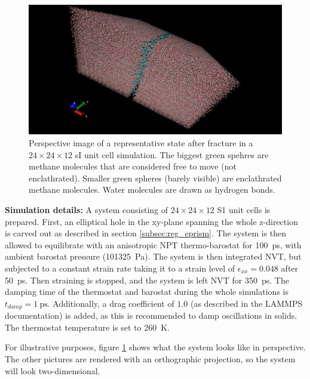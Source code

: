 \begin{figure}
\includegraphics[width=\textwidth]{../pictures/system_1048.pdf}
\caption{Perspective image of a representative state after fracture in a $24\times 24 \times 12$ sI unit cell simulation. The biggest green spehres are methane molecules that are considered free to move (not enclathrated). Smaller green spheres (barely visible) are enclathrated methane molecules. Water molecules are drawn as hydrogen bonds.}
\label{fig:system_1048}
\end{figure}

\begin{framed} 
\textbf{Simulation details:} A system consisting of $24 \times 24\times 12$ S1 unit cells is prepared. First, an elliptical hole in the xy-plane spanning the whole z-direction is carved out as described in section \ref{subsec:reg_eprism}. The system is then allowed to equilibrate with an anisotropic NPT thermo-barostat for \SI{100}{\pico\second}, with ambient barostat pressure (\SI{101325}{\pascal}). The system is then integrated NVT, but subjected to a constant strain rate taking it to a strain level of $\epsilon_{xx} = 0.048$ after \SI{50}{\pico\second}. Then straining is stopped, and the system is left NVT for \SI{350}{\pico\second}. The damping time of the thermostat and barostat during the whole simulations is $t_{damp} = \SI{1}{\ps}$. Additionally, a drag coefficient of $1.0$ (as described in the LAMMPS documentation) is added, as this is recommended to damp oscillations in solids. The thermostat temperature is set to \SI{260}{\kelvin}.
\end{framed}

For illustrative purposes, figure \ref{fig:system_1048} shows what the system looks like in perspective. The other pictures are rendered with an orthographic projection, so the system will look two-dimensional. 

